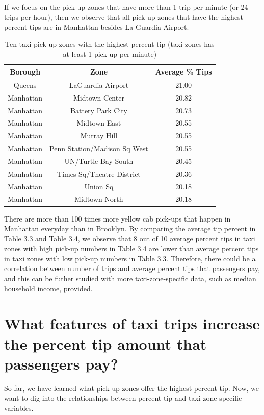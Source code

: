 \documentclass[12pt,twoside]{reedthesis}
\theoremstyle{definition}
\theoremstyle{definition}
\theoremstyle{definition}
\theoremstyle{remark}
\begin{document}
If we focus on the pick-up zones that have more than 1 trip per minute
(or 24 trips per hour), then we observe that all pick-up zones that have
the highest percent tips are in Manhattan besides La Guardia Airport.
\begin{table}

\caption{\label{tab:unnamed-chunk-46}Ten taxi pick-up zones with the highest percent tip (taxi zones has at least 1 pick-up per minute)}
\centering
\begin{tabular}[t]{ccc}
\toprule
Borough & Zone & Average \% Tips\\
\midrule
Queens & LaGuardia Airport & 21.00\\
Manhattan & Midtown Center & 20.82\\
Manhattan & Battery Park City & 20.73\\
Manhattan & Midtown East & 20.55\\
Manhattan & Murray Hill & 20.55\\
\addlinespace
Manhattan & Penn Station/Madison Sq West & 20.55\\
Manhattan & UN/Turtle Bay South & 20.45\\
Manhattan & Times Sq/Theatre District & 20.36\\
Manhattan & Union Sq & 20.18\\
Manhattan & Midtown North & 20.18\\
\bottomrule
\end{tabular}
\end{table}
There are more than 100 times more yellow cab pick-ups that happen in
Manhattan everyday than in Brooklyn. By comparing the average tip
percent in Table 3.3 and Table 3.4, we observe that 8 out of 10 average
percent tips in taxi zones with high pick-up numbers in Table 3.4 are
lower than average percent tips in taxi zones with low pick-up numbers
in Table 3.3. Therefore, there could be a correlation between number of
trips and average percent tips that passengers pay, and this can be
futher studied with more taxi-zone-specific data, such as median
household income, provided.

\section{What features of taxi trips increase the percent tip amount
that passengers
pay?}\label{what-features-of-taxi-trips-increase-the-percent-tip-amount-that-passengers-pay}

So far, we have learned what pick-up zones offer the highest percent
tip. Now, we want to dig into the relationships between percent tip and
taxi-zone-specific variables.
\end{document}
